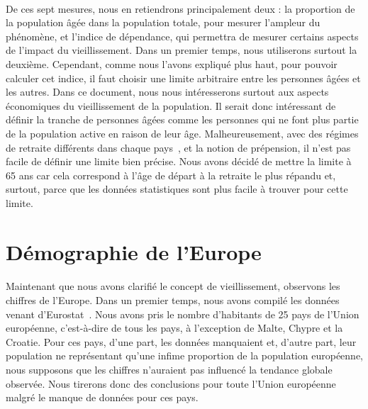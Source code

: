 \paragraph{} De ces sept mesures, nous en retiendrons principalement deux : la proportion de la population âgée dans la population totale, pour mesurer l’ampleur du phénomène, et l’indice de dépendance, qui permettra de mesurer certains aspects de l’impact du vieillissement. Dans un premier temps, nous utiliserons surtout la deuxième. Cependant, comme nous l’avons expliqué plus haut, pour pouvoir calculer cet indice, il faut choisir une limite arbitraire entre les personnes âgées et les autres. Dans ce document, nous nous intéresserons surtout aux aspects économiques du vieillissement de la population. Il serait donc intéressant de définir la tranche de personnes âgées comme les personnes qui ne font plus partie de la population active en raison de leur âge. Malheureusement, avec des régimes de retraite différents dans chaque pays~\citep{age_retraite}, et la notion de prépension, il n’est pas facile de définir une limite bien précise. Nous avons décidé de mettre la limite à 65 ans car cela correspond à l’âge de départ à la retraite le plus répandu et, surtout, parce que les données statistiques sont plus facile à trouver pour cette limite. 

\section{Démographie de l'Europe}
\paragraph{}Maintenant que nous avons clarifié le concept de vieillissement, observons les chiffres de l’Europe. Dans un premier temps, nous avons compilé les données venant d'Eurostat~\citep{eurostat_pop}. Nous avons pris le nombre d’habitants de 25 pays de l’Union européenne, c’est-à-dire de tous les pays, à l’exception de Malte, Chypre et la Croatie. Pour ces pays, d'une part, les données manquaient et, d'autre part, leur population ne représentant qu'une infime proportion de la population européenne, nous supposons que les chiffres n’auraient pas influencé la tendance globale observée. Nous tirerons donc des conclusions pour toute l’Union européenne malgré le manque de données pour ces pays.

